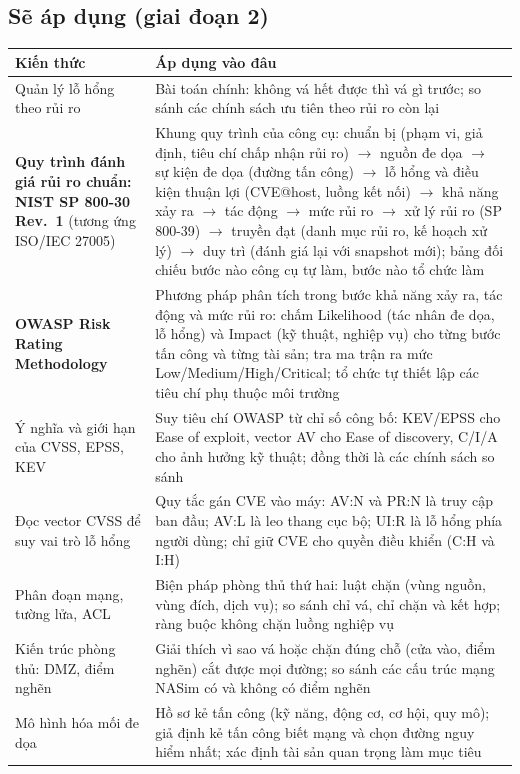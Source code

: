 \documentclass[11pt,a4paper]{article}
\begin{document}
\subsection{Sẽ áp dụng (giai đoạn 2)}

\begin{center}
\small
\begin{tabular}{@{}Y{4.6cm}Y{11.4cm}@{}}
\toprule
\textbf{Kiến thức} & \textbf{Áp dụng vào đâu} \\
\midrule
Quản lý lỗ hổng theo rủi ro & Bài toán chính: không vá hết được thì vá gì trước; so sánh các chính sách ưu tiên theo rủi ro còn lại \\
\textbf{Quy trình đánh giá rủi ro chuẩn: NIST SP 800-30 Rev.~1} (tương ứng ISO/IEC 27005) & Khung quy trình của công cụ: chuẩn bị (phạm vi, giả định, tiêu chí chấp nhận rủi ro) $\to$ nguồn đe dọa $\to$ sự kiện đe dọa (đường tấn công) $\to$ lỗ hổng và điều kiện thuận lợi (CVE@host, luồng kết nối) $\to$ khả năng xảy ra $\to$ tác động $\to$ mức rủi ro $\to$ xử lý rủi ro (SP 800-39) $\to$ truyền đạt (danh mục rủi ro, kế hoạch xử lý) $\to$ duy trì (đánh giá lại với snapshot mới); bảng đối chiếu bước nào công cụ tự làm, bước nào tổ chức làm \\
\textbf{OWASP Risk Rating Methodology} & Phương pháp phân tích trong bước khả năng xảy ra, tác động và mức rủi ro: chấm Likelihood (tác nhân đe dọa, lỗ hổng) và Impact (kỹ thuật, nghiệp vụ) cho từng bước tấn công và từng tài sản; tra ma trận ra mức Low/Medium/High/Critical; tổ chức tự thiết lập các tiêu chí phụ thuộc môi trường \\
Ý nghĩa và giới hạn của CVSS, EPSS, KEV & Suy tiêu chí OWASP từ chỉ số công bố: KEV/EPSS cho Ease of exploit, vector AV cho Ease of discovery, C/I/A cho ảnh hưởng kỹ thuật; đồng thời là các chính sách so sánh \\
Đọc vector CVSS để suy vai trò lỗ hổng & Quy tắc gán CVE vào máy: AV:N và PR:N là truy cập ban đầu; AV:L là leo thang cục bộ; UI:R là lỗ hổng phía người dùng; chỉ giữ CVE cho quyền điều khiển (C:H và I:H) \\
Phân đoạn mạng, tường lửa, ACL & Biện pháp phòng thủ thứ hai: luật chặn (vùng nguồn, vùng đích, dịch vụ); so sánh chỉ vá, chỉ chặn và kết hợp; ràng buộc không chặn luồng nghiệp vụ \\
Kiến trúc phòng thủ: DMZ, điểm nghẽn & Giải thích vì sao vá hoặc chặn đúng chỗ (cửa vào, điểm nghẽn) cắt được mọi đường; so sánh các cấu trúc mạng NASim có và không có điểm nghẽn \\
Mô hình hóa mối đe dọa & Hồ sơ kẻ tấn công (kỹ năng, động cơ, cơ hội, quy mô); giả định kẻ tấn công biết mạng và chọn đường nguy hiểm nhất; xác định tài sản quan trọng làm mục tiêu \\

\end{tabular}
\end{center}
\end{document}
